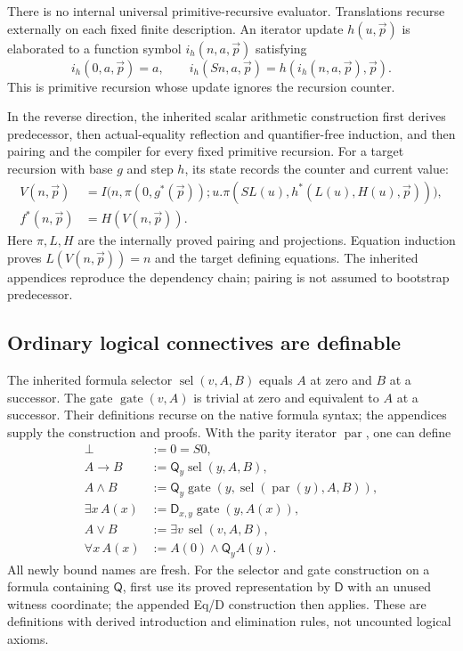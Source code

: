 \documentclass[11pt,letterpaper]{article}
\theoremstyle{definition}
\theoremstyle{remark}
\newcommand{\D}{\mathsf D}
\newcommand{\Q}{\mathsf Q}
\begin{document}
There is no internal universal primitive-recursive evaluator.
Translations recurse externally on each fixed finite description.
An iterator update $h(u,\vec p)$ is elaborated to a function symbol
$i_h(n,a,\vec p)$ satisfying
\[
 i_h(0,a,\vec p)=a,\qquad
 i_h(Sn,a,\vec p)=h(i_h(n,a,\vec p),\vec p).
\]
This is primitive recursion whose update ignores the recursion counter.

In the reverse direction, the inherited scalar arithmetic construction
first derives predecessor, then actual-equality reflection and
quantifier-free induction, and then pairing and the compiler for every
fixed primitive recursion. For a target recursion with base $g$ and
step $h$, its state records the counter and current value:
\begin{align*}
 V(n,\vec p)&=
 I\bigl(n,\pi(0,g^*(\vec p));
 u.\pi(SL(u),h^*(L(u),H(u),\vec p))\bigr),\\
 f^*(n,\vec p)&=H(V(n,\vec p)).
\end{align*}
Here $\pi,L,H$ are the internally proved pairing and projections.
Equation induction proves $L(V(n,\vec p))=n$ and the target defining
equations. The inherited appendices reproduce the dependency chain;
pairing is not assumed to bootstrap predecessor.

\subsection{Ordinary logical connectives are definable}

The inherited formula selector $\operatorname{sel}(v,A,B)$ equals $A$
at zero and $B$ at a successor. The gate $\operatorname{gate}(v,A)$ is
trivial at zero and equivalent to $A$ at a successor. Their definitions
recurse on the native formula syntax; the appendices supply the
construction and proofs. With the parity iterator $\operatorname{par}$,
one can define
\begin{align*}
 \bot&:=0=S0,\\
 A\to B&:=\Q_y\operatorname{sel}(y,A,B),\\
 A\land B&:=\Q_y\operatorname{gate}
      (y,\operatorname{sel}(\operatorname{par}(y),A,B)),\\
 \exists x\,A(x)&:=\D_{x,y}\operatorname{gate}(y,A(x)),\\
 A\lor B&:=\exists v\,\operatorname{sel}(v,A,B),\\
 \forall x\,A(x)&:=A(0)\land\Q_y A(y).
\end{align*}
All newly bound names are fresh. For the selector and gate construction on a formula containing $\Q$,
first use its proved representation by $\D$ with an unused witness
coordinate; the appended Eq/D construction then applies. These are
definitions with derived introduction and elimination rules, not
uncounted logical axioms.
\end{document}
